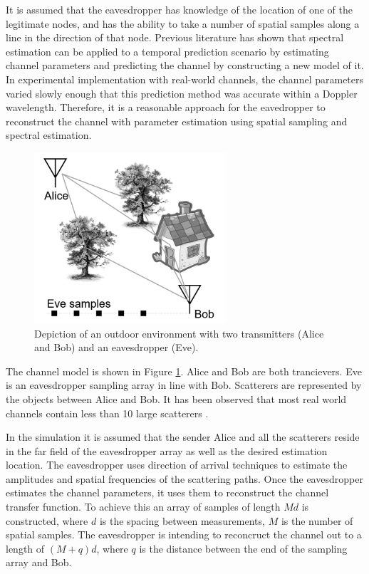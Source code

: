 \documentclass{allertonproc}
\begin{document}
It is assumed that the eavesdropper has knowledge of the location of one of the legitimate nodes, and has the ability to take a number of spatial samples along a line in the direction of that node.  Previous literature \cite{duel-hallen2007} has shown that spectral estimation can be applied to a temporal prediction scenario by estimating channel parameters and predicting the channel by constructing a new model of it. In experimental implementation with real-world channels, the channel parameters varied slowly enough that this prediction method was accurate within a Doppler wavelength. Therefore, it is a reasonable approach for the eavedropper to reconstruct the channel with parameter estimation using spatial sampling and spectral estimation. 


\begin{figure}[ht!]
\begin{center}
\includegraphics[height=2.5in]{Scenario}
\caption{Depiction of an outdoor environment with two transmitters (Alice and Bob) and an eavesdropper (Eve).}\label{scene}
\end{center}
\end{figure}

The channel model is shown in Figure \ref{scene}. Alice and Bob are both trancievers. Eve is an eavesdropper sampling array in line with Bob. Scatterers are represented by the objects between Alice and Bob. It has been observed that most real world channels contain less than 10 large scatterers \cite{duel-hallen2000}. 

In the simulation it is assumed that the sender Alice and all the scatterers reside in the far field of the eavesdropper array as well as the desired estimation location. The eavesdropper uses direction of arrival techniques to estimate the amplitudes and spatial frequencies of the scattering paths. Once the eavesdropper estimates the channel parameters, it uses them to reconstruct the channel transfer function. To achieve this an array of samples of length $Md$ is constructed, where $d$ is the spacing between measurements, $M$ is the number of spatial samples. The eavesdropper is intending to reconcruct the channel out to a length of $(M+q)d$, where $q$ is the distance between the end of the sampling array and Bob. 
\end{document}
